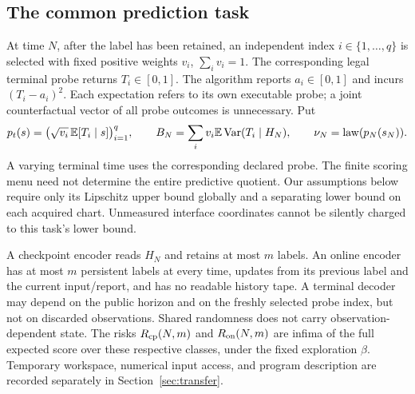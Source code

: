 \subsection{The common prediction task}
At time $N$, after the label has been retained, an independent index $i\in\{1,\ldots,q\}$ is selected with fixed positive weights $v_i$, $\sum_i v_i=1$. The corresponding legal terminal probe returns $T_i\in[0,1]$. The algorithm reports $a_i\in[0,1]$ and incurs $(T_i-a_i)^2$. Each expectation refers to its own executable probe; a joint counterfactual vector of all probe outcomes is unnecessary. Put
\begin{equation}\label{eq:score}
 p_t(s)=\big(\sqrt{v_i}\,\mathbb E[T_i\mid s]\big)_{i=1}^q,
 \qquad B_N=\sum_i v_i\mathbb E\operatorname{Var}(T_i\mid H_N),
 \qquad \nu_N=\operatorname{law}(p_N(s_N)).
\end{equation}
A varying terminal time uses the corresponding declared probe. The finite scoring menu need not determine the entire predictive quotient. Our assumptions below require only its Lipschitz upper bound globally and a separating lower bound on each acquired chart. Unmeasured interface coordinates cannot be silently charged to this task's lower bound.

A checkpoint encoder reads $H_N$ and retains at most $m$ labels. An online encoder has at most $m$ persistent labels at every time, updates from its previous label and the current input/report, and has no readable history tape. A terminal decoder may depend on the public horizon and on the freshly selected probe index, but not on discarded observations. Shared randomness does not carry observation-dependent state. The risks $R_{\mathrm{cp}}(N,m)$ and $R_{\mathrm{on}}(N,m)$ are infima of the full expected score over these respective classes, under the fixed exploration $\beta$. Temporary workspace, numerical input access, and program description are recorded separately in Section~\ref{sec:transfer}.
